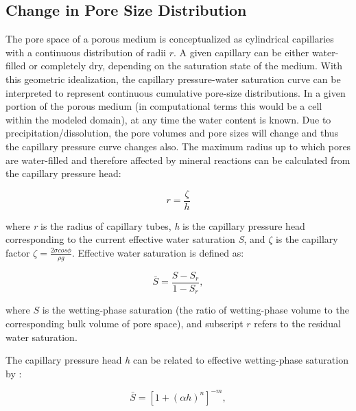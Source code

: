 \documentclass[preprint,12pt,authoryear]{elsarticle}
\begin{document}
\subsection{Change in Pore Size Distribution}

The pore space of a porous medium is conceptualized as cylindrical capillaries with a continuous distribution of radii $r$. A given capillary can be either water-filled or completely dry, depending on the saturation state of the medium. With this geometric idealization, the capillary pressure-water saturation curve can be interpreted to represent continuous cumulative pore-size distributions. In a given portion of the porous medium (in computational terms this would be a cell within the modeled domain), at any time the water content is known. Due to precipitation/dissolution, the pore volumes and pore sizes will change and thus the capillary pressure curve changes also. The maximum radius up to which pores are water-filled and therefore affected by mineral reactions can be calculated from the capillary pressure head: 

\begin{equation}
\label{eq:hr}
r = \frac{\zeta}{h}
\end{equation}

where \textit{r} is the radius of capillary tubes, \textit{h} is the capillary pressure head corresponding to the current effective water saturation \textit{S}, and $\zeta$ is the capillary factor $\zeta = \frac{2\sigma cos \phi}{\rho g}$. Effective water saturation is defined as: 

\begin{equation}
\label{eq:Stheta}
\bar{S}=\frac{S-S_r}{1-S_{r}},
\end{equation}


where $S$ is the wetting-phase saturation (the ratio of wetting-phase volume to the corresponding bulk volume of pore space), and subscript $r$ refers to the residual water saturation.

The capillary pressure head \textit{h} can be related to effective wetting-phase saturation by \citet{van1980closed}:

\begin{equation}
\label{eq:Sh}
\bar{S}=[1+(\alpha h)^{n}]^{-m},
\end{equation}
\end{document}
